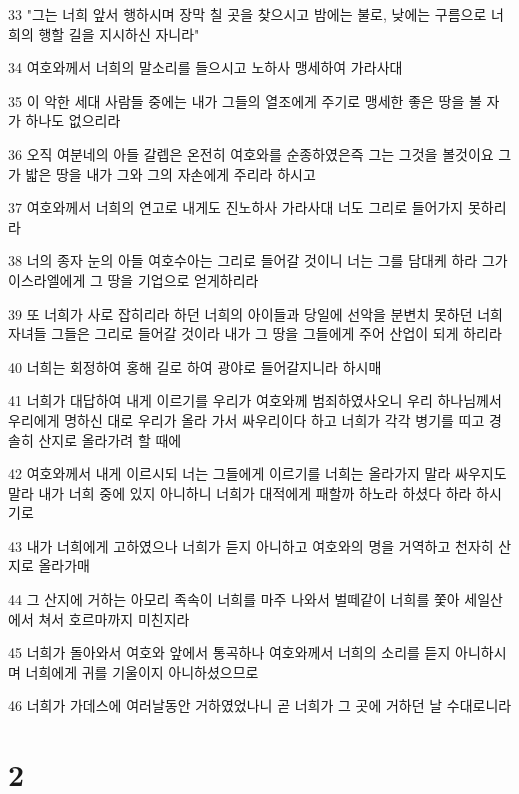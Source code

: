 \par 33 "그는 너희 앞서 행하시며 장막 칠 곳을 찾으시고 밤에는 불로, 낮에는 구름으로 너희의 행할 길을 지시하신 자니라"
\par 34 여호와께서 너희의 말소리를 들으시고 노하사 맹세하여 가라사대
\par 35 이 악한 세대 사람들 중에는 내가 그들의 열조에게 주기로 맹세한 좋은 땅을 볼 자가 하나도 없으리라
\par 36 오직 여분네의 아들 갈렙은 온전히 여호와를 순종하였은즉 그는 그것을 볼것이요 그가 밟은 땅을 내가 그와 그의 자손에게 주리라 하시고
\par 37 여호와께서 너희의 연고로 내게도 진노하사 가라사대 너도 그리로 들어가지 못하리라
\par 38 너의 종자 눈의 아들 여호수아는 그리로 들어갈 것이니 너는 그를 담대케 하라 그가 이스라엘에게 그 땅을 기업으로 얻게하리라
\par 39 또 너희가 사로 잡히리라 하던 너희의 아이들과 당일에 선악을 분변치 못하던 너희 자녀들 그들은 그리로 들어갈 것이라 내가 그 땅을 그들에게 주어 산업이 되게 하리라
\par 40 너희는 회정하여 홍해 길로 하여 광야로 들어갈지니라 하시매
\par 41 너희가 대답하여 내게 이르기를 우리가 여호와께 범죄하였사오니 우리 하나님께서 우리에게 명하신 대로 우리가 올라 가서 싸우리이다 하고 너희가 각각 병기를 띠고 경솔히 산지로 올라가려 할 때에
\par 42 여호와께서 내게 이르시되 너는 그들에게 이르기를 너희는 올라가지 말라 싸우지도 말라 내가 너희 중에 있지 아니하니 너희가 대적에게 패할까 하노라 하셨다 하라 하시기로
\par 43 내가 너희에게 고하였으나 너희가 듣지 아니하고 여호와의 명을 거역하고 천자히 산지로 올라가매
\par 44 그 산지에 거하는 아모리 족속이 너희를 마주 나와서 벌떼같이 너희를 쫓아 세일산에서 쳐서 호르마까지 미친지라
\par 45 너희가 돌아와서 여호와 앞에서 통곡하나 여호와께서 너희의 소리를 듣지 아니하시며 너희에게 귀를 기울이지 아니하셨으므로
\par 46 너희가 가데스에 여러날동안 거하였었나니 곧 너희가 그 곳에 거하던 날 수대로니라

\chapter{2}

